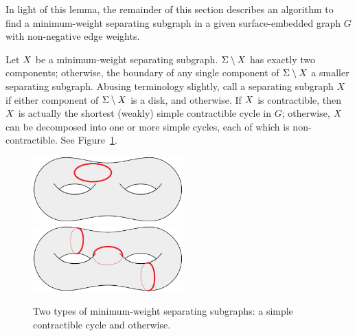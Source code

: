 \documentclass[11pt,twoside]{article}
\def\Real{\mathbb{R}}
\begin{document}
{In light of this lemma, the remainder of this section describes an algorithm to find a minimum-weight separating subgraph in a given surface-embedded graph $G$ with non-negative edge weights.
%


Let $X$ be a minimum-weight separating subgraph.  $\Sigma \setminus X$ has exactly two components; otherwise, the boundary of any single component of $\Sigma \setminus X$ a smaller separating subgraph.   Abusing terminology slightly, call a separating subgraph $X$  if either component of $\Sigma \setminus X$ is a disk, and  otherwise.  If $X$ is contractible, then $X$ is actually the shortest (weakly) simple contractible cycle in $G$; otherwise, $X$ can be decomposed into one or more simple cycles, each of which is non-contractible.  See Figure~\ref{fig:global_cases}.

%
%
%

\begin{figure}[ht]
\centering
\includegraphics[height=1in]{Fig/shortcon2}\qquad
\includegraphics[height=1in]{Fig/homologous1}
\caption{Two types of minimum-weight separating subgraphs: a simple contractible cycle and otherwise.}
\label{fig:global_cases}
\end{figure}

}
\end{document}
